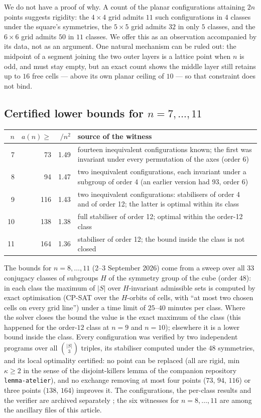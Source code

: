 \documentclass[11pt,a4paper]{article}
\begin{document}
We do not have a proof of why.  A count of the planar configurations attaining $2n$ points suggests rigidity:
the $4\times4$ grid admits $11$ such configurations in $4$ classes under the square's symmetries, the $5\times5$
grid admits $32$ in only $5$ classes, and the $6\times6$ grid admits $50$ in $11$ classes.  We offer this as an
observation accompanied by its data, not as an argument.  One natural mechanism can be ruled out: the midpoint
of a segment joining the two outer layers is a lattice point when $n$ is odd, and must stay empty, but an exact
count shows the middle layer still retains up to $16$ free cells --- above its own planar ceiling of $10$ --- so
that constraint does not bind.

\subsection{Certified lower bounds for \texorpdfstring{$n=7,\dots,11$}{n = 7, ..., 11}}\label{s:lb3}
\begin{center}\begin{tabular}{rrrp{8.6cm}}\toprule
$n$ & $a(n)\ge$ & $/n^2$ & source of the witness\\\midrule
7 & 73 & 1.49 & fourteen inequivalent configurations known; the first was invariant under every permutation of the axes (order 6)\\
8 & 94 & 1.47 & two inequivalent configurations, each invariant under a subgroup of order 4 (an earlier version had $93$, order 6)\\
9 & 116 & 1.43 & two inequivalent configurations: stabilisers of order 4 and of order 12; the latter is optimal within its class\\
10 & 138 & 1.38 & full stabiliser of order 12; optimal within the order-12 class\\
11 & 164 & 1.36 & stabiliser of order 12; the bound inside the class is not closed\\\bottomrule
\end{tabular}\end{center}
The bounds for $n=8,\dots,11$ (2--3 September 2026) come from a sweep over all $33$ conjugacy
classes of subgroups $H$ of the symmetry group of the cube (order $48$): in each class the maximum of $|S|$
over $H$-invariant admissible sets is computed by exact optimisation (CP-SAT over the $H$-orbits of cells, with
``at most two chosen cells on every grid line'') under a time limit of $25$--$40$ minutes per class.  Where the
solver closes the bound the value is the exact maximum of the class (this happened for the order-$12$ class at
$n=9$ and $n=10$); elsewhere it is a lower bound inside the class.  Every configuration was verified by two
independent programs over all $\binom{|S|}{3}$ triples, its stabiliser computed under the $48$ symmetries, and
its local optimality certified: no point can be replaced (all are rigid, min $\kappa\ge2$ in the sense of the
disjoint-killers lemma of the companion repository \texttt{lemma-atelier}), and no exchange removing at most
four points ($73$, $94$, $116$) or three points ($138$, $164$) improves it.  The configurations, the per-class
results and the verifier are archived separately \cite{Witnesses}; the six witnesses for $n=8,\dots,11$ are
among the ancillary files of this article.
\end{document}
